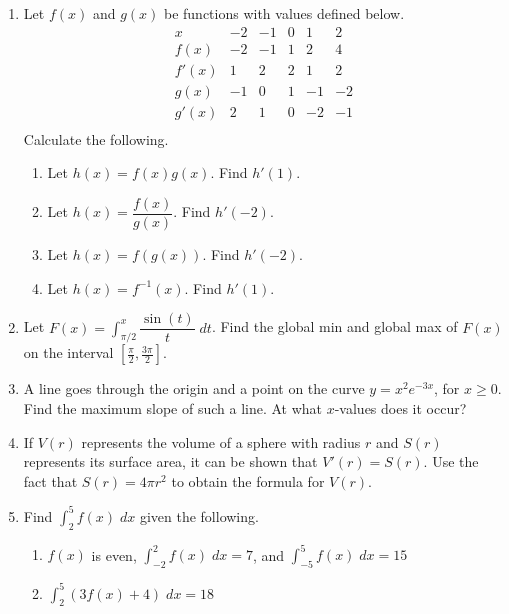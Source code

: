 \documentclass[11pt]{article}
\newcommand{\ds}{\displaystyle}
\begin{document}
\begin{enumerate}
\item Let $f(x)$ and $g(x)$ be functions with values defined below.
  \[
  \begin{array}{c||c|c|c|c|c}
    x & -2 & -1 & 0 & 1 & 2\\
    \hline\hline
    f(x) & -2 & -1 & 1 & 2 & 4\\ \hline
    f'(x) & 1 & 2 & 2 & 1 & 2\\ \hline
    g(x) & -1 & 0 & 1 & -1 & -2\\ \hline
    g'(x) & 2 & 1 & 0 & -2 & -1\\ 
  \end{array}
  \]
  Calculate the following.
  \begin{enumerate}
  \item Let $h(x)=f(x)g(x)$.  Find $h'(1)$.\vfill
  \item Let $h(x)=\dfrac{f(x)}{g(x)}$.  Find $h'(-2)$.\vfill
  \item Let $h(x)=f(g(x))$.  Find $h'(-2)$.\vfill
  \item Let $h(x)=f^{-1}(x)$.  Find $h'(1)$.\vfill
  \end{enumerate}

  \newpage

\item Let $\ds F(x)=\int_{\pi/2}^x \dfrac{\sin(t)}{t}\;dt$.  Find the
  global min and global max of $F(x)$ on the interval
  $\left[\frac{\pi}{2},\frac{3\pi}{2}\right]$.

  \newpage

\item A line goes through the origin and a point on the curve $y=x^2
  e^{-3x}$, for $x\geq 0$.  Find the maximum slope of such a line.  At
  what $x$-values does it occur?

  \newpage

\item If $V(r)$ represents the volume of a sphere with radius $r$ and
  $S(r)$ represents its surface area, it can be shown that
  $V'(r)=S(r)$.  Use the fact that $S(r)=4\pi r^2$ to obtain the
  formula for $V(r)$.

  \vfill

\item Find $\int_2^5 f(x)\;dx$ given the following.
  \begin{enumerate}
  \item $f(x)$ is even, $\int_{-2}^2 f(x)\;dx=7$, and $\int_{-5}^5 f(x)\;dx=15$

    \vfill

  \item $\int_2^5 (3f(x)+4)\;dx = 18$

    \vfill
  \end{enumerate}
  
\end{enumerate}
\end{document}
